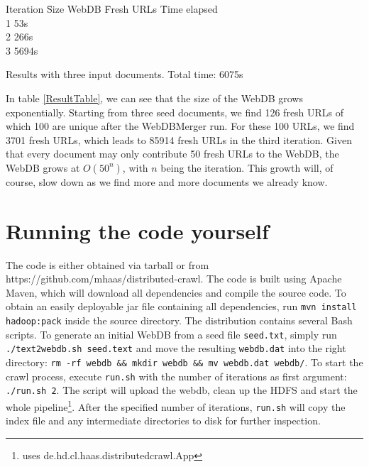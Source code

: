 \documentclass[10pt,a4paper]{report}
\begin{document}
\begin{table}
\begin{tabbing}
Iteration \= Size WebDB \= Fresh URLs \= Time elapsed \\
1    \> 53s\\ 
2   \> 266s\\
3   \> 5694s\\
\end{tabbing}
\caption{Results with three input documents. Total time: 6075s}
\label{ResultTable}
\end{table}

In table \ref{ResultTable}, we can see that the size of the WebDB grows exponentially. Starting from three seed documents, we find 126 fresh URLs of which 100 are unique after the WebDBMerger run.
For these 100 URLs, we find 3701 fresh URLs, which leads to 85914 fresh URLs in the third iteration. Given that every document may only contribute 50 fresh URLs
to the WebDB, the WebDB grows at $O(50^n)$, with $n$ being the iteration. This growth will, of course, slow down as we find more and more documents we already know.

\section*{Running the code yourself}
The code is either obtained via tarball or from https://github.com/mhaas/distributed-crawl. The code is built using Apache Maven, which will download
all dependencies and compile the source code. To obtain an easily deployable jar file containing all dependencies, run \texttt{mvn install hadoop:pack} inside the source directory.
The distribution contains several Bash scripts. To generate an initial WebDB from a seed file \texttt{seed.txt}, simply run \texttt{./text2webdb.sh seed.text} and move the resulting \texttt{webdb.dat} into the right directory: \texttt{rm -rf webdb \&\& mkdir webdb \&\& mv webdb.dat webdb/}.
To start the crawl process, execute \texttt{run.sh} with the number of iterations as first argument: \texttt{./run.sh 2}. The script will upload the webdb,
clean up the HDFS and start the whole pipeline\footnote{uses de.hd.cl.haas.distributedcrawl.App}. After the specified number of iterations, \texttt{run.sh} will copy
the index file and any intermediate directories to disk for further inspection.
\end{document}
